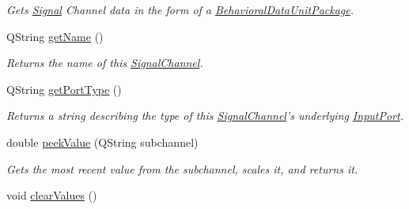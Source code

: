 \begin{DoxyCompactItemize}
\begin{DoxyCompactList}\small\item\em Gets \hyperlink{class_picto_1_1_signal}{Signal} Channel data in the form of a \hyperlink{class_picto_1_1_behavioral_data_unit_package}{Behavioral\-Data\-Unit\-Package}. \end{DoxyCompactList}\item 
\hypertarget{class_picto_1_1_signal_channel_a697b1be76af81057d3ce59fb892d2abe}{Q\-String \hyperlink{class_picto_1_1_signal_channel_a697b1be76af81057d3ce59fb892d2abe}{get\-Name} ()}\label{class_picto_1_1_signal_channel_a697b1be76af81057d3ce59fb892d2abe}

\begin{DoxyCompactList}\small\item\em Returns the name of this \hyperlink{class_picto_1_1_signal_channel}{Signal\-Channel}. \end{DoxyCompactList}\item 
Q\-String \hyperlink{class_picto_1_1_signal_channel_a0a5321fb5ec2acfe047d21f3b8421ce5}{get\-Port\-Type} ()
\begin{DoxyCompactList}\small\item\em Returns a string describing the type of this \hyperlink{class_picto_1_1_signal_channel}{Signal\-Channel}'s underlying \hyperlink{class_picto_1_1_input_port}{Input\-Port}. \end{DoxyCompactList}\item 
double \hyperlink{class_picto_1_1_signal_channel_ad5df0c04b3e889c4f68f9d6bfec001bb}{peek\-Value} (Q\-String subchannel)
\begin{DoxyCompactList}\small\item\em Gets the most recent value from the subchannel, scales it, and returns it. \end{DoxyCompactList}\item 
\hypertarget{class_picto_1_1_signal_channel_acc73cc79098df2b940c3390a235ecf5c}{void \hyperlink{class_picto_1_1_signal_channel_acc73cc79098df2b940c3390a235ecf5c}{clear\-Values} ()}\label{class_picto_1_1_signal_channel_acc73cc79098df2b940c3390a235ecf5c}


\end{DoxyCompactItemize}
